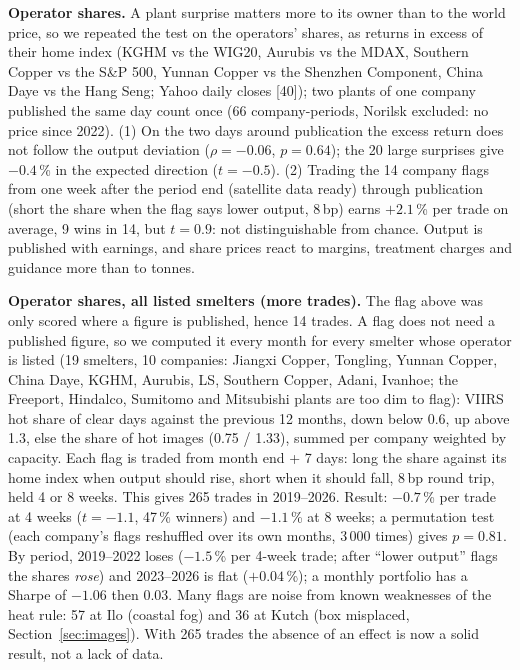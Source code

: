 \documentclass[10pt,a4paper]{article}
\begin{document}
\textbf{Operator shares.} A plant surprise matters more to its owner than to the world price, so we repeated the test on the operators' shares, as returns in excess of their home index (KGHM vs the WIG20, Aurubis vs the MDAX, Southern Copper vs the S\&P 500, Yunnan Copper vs the Shenzhen Component, China Daye vs the Hang Seng; Yahoo daily closes [40]); two plants of one company published the same day count once (66 company-periods, Norilsk excluded: no price since 2022). (1) On the two days around publication the excess return does not follow the output deviation ($\rho=-0.06$, $p=0.64$); the 20 large surprises give $-0.4$\,\% in the expected direction ($t=-0.5$). (2) Trading the 14 company flags from one week after the period end (satellite data ready) through publication (short the share when the flag says lower output, 8\,bp) earns $+2.1$\,\% per trade on average, 9 wins in 14, but $t=0.9$: not distinguishable from chance. Output is published with earnings, and share prices react to margins, treatment charges and guidance more than to tonnes.

\textbf{Operator shares, all listed smelters (more trades).} The flag above was only scored where a figure is published, hence 14 trades. A flag does not need a published figure, so we computed it every month for every smelter whose operator is listed (19 smelters, 10 companies: Jiangxi Copper, Tongling, Yunnan Copper, China Daye, KGHM, Aurubis, LS, Southern Copper, Adani, Ivanhoe; the Freeport, Hindalco, Sumitomo and Mitsubishi plants are too dim to flag): VIIRS hot share of clear days against the previous 12 months, down below 0.6, up above 1.3, else the share of hot images (0.75 / 1.33), summed per company weighted by capacity. Each flag is traded from month end + 7 days: long the share against its home index when output should rise, short when it should fall, 8\,bp round trip, held 4 or 8 weeks. This gives 265 trades in 2019--2026. Result: $-0.7$\,\% per trade at 4 weeks ($t=-1.1$, 47\,\% winners) and $-1.1$\,\% at 8 weeks; a permutation test (each company's flags reshuffled over its own months, 3\,000 times) gives $p=0.81$. By period, 2019--2022 loses ($-1.5$\,\% per 4-week trade; after ``lower output'' flags the shares \emph{rose}) and 2023--2026 is flat ($+0.04$\,\%); a monthly portfolio has a Sharpe of $-1.06$ then $0.03$. Many flags are noise from known weaknesses of the heat rule: 57 at Ilo (coastal fog) and 36 at Kutch (box misplaced, Section~\ref{sec:images}). With 265 trades the absence of an effect is now a solid result, not a lack of data.
\end{document}
